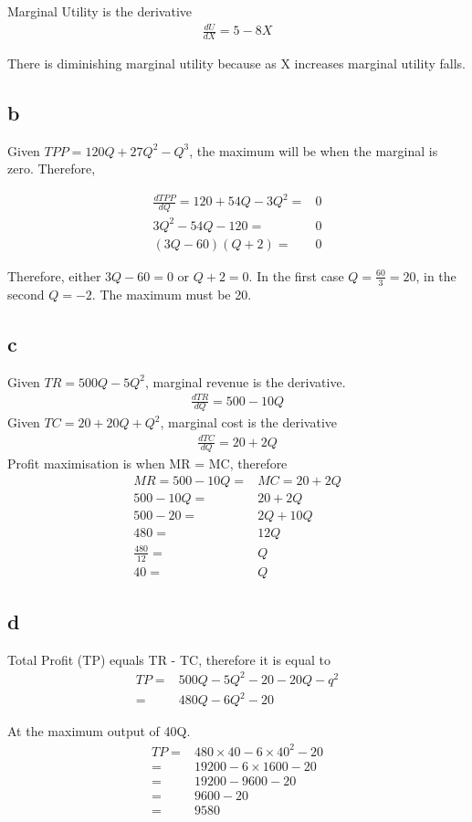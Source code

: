 \documentclass[12pt, a4paper, oneside]{article}\usepackage[]{graphicx}\usepackage[]{color}
\begin{document}
Marginal Utility is the derivative 
\begin{align*}
\frac{dU}{dX} = 5 - 8X
\end{align*}

There is diminishing marginal utility because as X increases marginal utility falls.

\subsection*{b}
Given $TPP = 120Q +27Q^2 -Q^3$, the maximum will be when the marginal is zero. Therefore, 

\begin{align*}
\frac{dTPP}{dQ} = 120 + 54Q - 3Q^2 =& 0\\
3Q^2 - 54Q -120 =& 0\\
(3Q - 60)(Q + 2) =&0
\end{align*}

Therefore, either $3Q -60 = 0$ or $Q + 2 = 0$.  In the first case $Q = \frac{60}{3} = 20$, in the second $Q = -2$.  The maximum must be 20. 

\subsection*{c}
Given $TR = 500Q - 5Q^2$, marginal revenue is the derivative. 
\begin{align*}
\frac{dTR}{dQ} = 500 - 10Q
\end{align*}
Given $TC = 20 +20Q +Q^2$, marginal cost is the derivative
\begin{align*}
\frac{dTC}{dQ} = 20 +2Q
\end{align*}
Profit maximisation is when MR = MC, therefore
\begin{align*}
MR = 500 - 10Q =& MC = 20 +2Q\\
500 - 10Q =& 20 +2Q\\
500 - 20 =& 2Q + 10Q\\
480 =& 12Q\\
\frac{480}{12} =& Q\\
40 =& Q
\end{align*}

\subsection*{d}
Total Profit (TP) equals TR - TC, therefore it is equal to 
\begin{align*}
TP =& 500Q - 5Q^2 - 20 -20Q - q^2\\
=& 480Q -6Q^2 -20
\end{align*}

At the maximum output of 40Q.
\begin{align*}
TP =& 480 \times 40 - 6 \times 40^2 - 20\\
=& 19200 - 6 \times 1600 - 20\\
=& 19200 - 9600 - 20\\
=& 9600 - 20\\
=& 9580
\end{align*}
\end{document}
